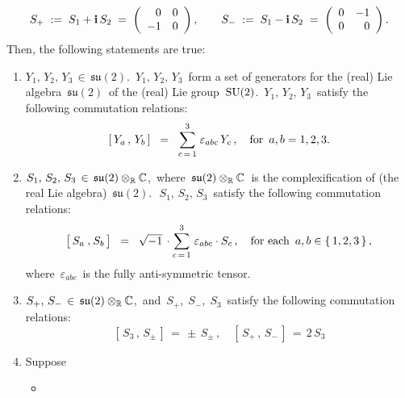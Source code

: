 \begin{proposition}
\begin{equation*}
\end{equation*}
\begin{equation*}
S_{+} \; := \; S_{1} + \textnormal{\bf i}\,S_{2} \; = \; \left(\begin{array}{rr} 0 & 0 \\ -1 & 0 \end{array}\right),
\quad\quad
S_{-} \; := \; S_{1} - \textnormal{\bf i}\,S_{2} \; = \; \left(\begin{array}{rr} 0 & -1 \\ 0 & 0 \end{array}\right).
\end{equation*}
Then, the following statements are true:
\begin{enumerate}
\item
	$Y_{1},\, Y_{2},\, Y_{3} \,\in\, \mathfrak{su}(2)$.\,
	$Y_{1},\, Y_{2},\, Y_{3}$\,
	form a set of generators for the (real) Lie algebra \,$\mathfrak{su}(2)$\, of the (real) Lie group \,$\textnormal{SU}(2)$.\,
	$Y_{1},\, Y_{2},\, Y_{3}$\, satisfy the following commutation relations:
	\begin{equation*}
	\left[\,Y_{a}\,,\,Y_{b}\,\right] \;\; = \;\; \overset{3}{\underset{c\,=\,1}{\sum}}\;\varepsilon_{abc}\,Y_{c}\,,
	\quad
	\textnormal{for \,$a, b = 1,2,3$}.
	\end{equation*}
\item
	$S_{1},\, S_{2},\, S_{3} \,\in\, \mathfrak{su}(2) \otimes_{\mathbb{R}} \mathbb{C}$,\,
	where
	\,$\mathfrak{su}(2) \otimes_{\mathbb{R}} \mathbb{C}$\,
	is the complexification of (the real Lie algebra)
	\,$\mathfrak{su}(2)$.\,
	\,$S_{1},\, S_{2},\, S_{3}$\,
	satisfy the following commutation relations:
	\begin{equation*}
	\left[\,S_{a}\,\overset{{\color{white}1}}{,}\,S_{b}\,\right]
	\;\; = \;\;
		\sqrt{-1}\,\cdot\overset{3}{\underset{c\,=\,1}{\sum}}\;\varepsilon_{abc}\cdot S_{c}\,,
	\quad
	\textnormal{for each \,$a, b \in \{\,1,2,3\,\}$}\,,
	\end{equation*}
	where \,$\varepsilon_{abc}$\, is the fully anti-symmetric tensor.
\item
	$S_{+},\, S_{-} \,\in\, \mathfrak{su}(2) \otimes_{\mathbb{R}} \mathbb{C}$,\,
	and
	\,$S_{+},\; S_{-},\; S_{3}$\, satisfy the following commutation relations:
	\begin{equation*}
	\left[\,S_{3}\,,\,S_{\pm}\,\right] \, = \, \pm\,S_{\pm}\,,
	\quad
	\left[\,S_{+}\,,\,S_{-}\,\right] \, = \, 2\,S_{3}
	\end{equation*}
\item
	Suppose
	\begin{itemize}
	\item

\end{itemize}
\end{enumerate}
\end{proposition}
